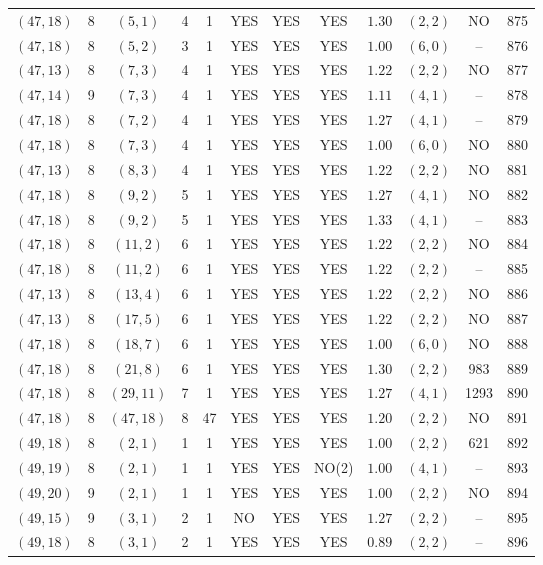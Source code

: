 \begin{longtable}{|c|c|c|c|c|c|c|c|c|c|c|c|}
$(47,18)$ & 8 & $(5,1)$ & 4 & 1 & YES & YES & YES & $1.30$ & $(2,2)$ & NO & 875\\
$(47,18)$ & 8 & $(5,2)$ & 3 & 1 & YES & YES & YES & $1.00$ & $(6,0)$ & -- & 876\\
$(47,13)$ & 8 & $(7,3)$ & 4 & 1 & YES & YES & YES & $1.22$ & $(2,2)$ & NO & 877\\
$(47,14)$ & 9 & $(7,3)$ & 4 & 1 & YES & YES & YES & $1.11$ & $(4,1)$ & -- & 878\\
$(47,18)$ & 8 & $(7,2)$ & 4 & 1 & YES & YES & YES & $1.27$ & $(4,1)$ & -- & 879\\
$(47,18)$ & 8 & $(7,3)$ & 4 & 1 & YES & YES & YES & $1.00$ & $(6,0)$ & NO & 880\\
$(47,13)$ & 8 & $(8,3)$ & 4 & 1 & YES & YES & YES & $1.22$ & $(2,2)$ & NO & 881\\
$(47,18)$ & 8 & $(9,2)$ & 5 & 1 & YES & YES & YES & $1.27$ & $(4,1)$ & NO & 882\\
$(47,18)$ & 8 & $(9,2)$ & 5 & 1 & YES & YES & YES & $1.33$ & $(4,1)$ & -- & 883\\
$(47,18)$ & 8 & $(11,2)$ & 6 & 1 & YES & YES & YES & $1.22$ & $(2,2)$ & NO & 884\\
$(47,18)$ & 8 & $(11,2)$ & 6 & 1 & YES & YES & YES & $1.22$ & $(2,2)$ & -- & 885\\
$(47,13)$ & 8 & $(13,4)$ & 6 & 1 & YES & YES & YES & $1.22$ & $(2,2)$ & NO & 886\\
$(47,13)$ & 8 & $(17,5)$ & 6 & 1 & YES & YES & YES & $1.22$ & $(2,2)$ & NO & 887\\
$(47,18)$ & 8 & $(18,7)$ & 6 & 1 & YES & YES & YES & $1.00$ & $(6,0)$ & NO & 888\\
$(47,18)$ & 8 & $(21,8)$ & 6 & 1 & YES & YES & YES & $1.30$ & $(2,2)$ & 983 & 889\\
$(47,18)$ & 8 & $(29,11)$ & 7 & 1 & YES & YES & YES & $1.27$ & $(4,1)$ & 1293 & 890\\
$(47,18)$ & 8 & $(47,18)$ & 8 & 47 & YES & YES & YES & $1.20$ & $(2,2)$ & NO & 891\\
$(49,18)$ & 8 & $(2,1)$ & 1 & 1 & YES & YES & YES & $1.00$ & $(2,2)$ & 621 & 892\\
$(49,19)$ & 8 & $(2,1)$ & 1 & 1 & YES & YES & NO(2) & $1.00$ & $(4,1)$ & -- & 893\\
$(49,20)$ & 9 & $(2,1)$ & 1 & 1 & YES & YES & YES & $1.00$ & $(2,2)$ & NO & 894\\
$(49,15)$ & 9 & $(3,1)$ & 2 & 1 & NO & YES & YES & $1.27$ & $(2,2)$ & -- & 895\\
$(49,18)$ & 8 & $(3,1)$ & 2 & 1 & YES & YES & YES & $0.89$ & $(2,2)$ & -- & 896\\

\end{longtable}
